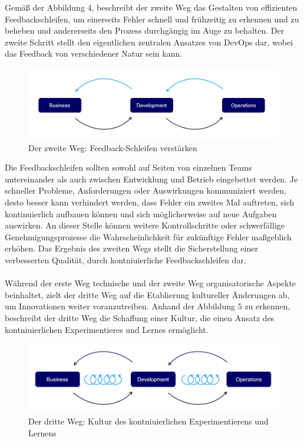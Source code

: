 Gemäß der Abbildung 4, beschreibt der zweite Weg das Gestalten von effizienten Feedbackschleifen, um einerseits Fehler schnell und frühzeitig zu erkennen und zu beheben und andererseits den Prozess durchgängig im Auge zu behalten. Der zweite Schritt stellt den eigentlichen zentralen Ansatzes von DevOps dar, wobei das Feedback von verschiedener Natur sein kann. \cite[S. 254]{tiemeyer_handbuch_2021} 

\begin{figure}[h]
    \centering
    \includegraphics[scale=0.5]{Bilder/Second Way.png}
    \caption{Der zweite Weg: Feedback-Schleifen verstärken \cite{kim_three_2012}}
\end{figure}

Die Feedbackschleifen sollten sowohl auf Seiten von einzelnen Teams untereinander als auch zwischen Entwicklung und Betrieb eingebettet werden. \cite[S. 94]{ravichandran_devops_2016} Je schneller Probleme, Anforderungen oder Auswirkungen kommuniziert werden, desto besser kann verhindert werden, dass Fehler ein zweites Mal auftreten, sich kontinuierlich aufbauen können und sich möglicherweise auf neue Aufgaben auswirken. An dieser Stelle können weitere Kontrollschritte oder schwerfällige Genehmigungsprozesse die Wahrscheinlichkeit für zukünftige Fehler maßgeblich erhöhen. \cite[S. 31]{kim_devops-handbuch_2017} Das Ergebnis des zweiten Wegs stellt die Sicherstellung einer verbesserten Qualität, durch kontniuierliche Feedbackschleifen dar.\\\\ Während der erste Weg technische und der zweite Weg organisatorische Aspekte beinhaltet, zielt der dritte Weg auf die Etablierung kultureller Änderungen ab, um Innovationen weiter voranzutreiben. Anhand der Abbildung 5 zu erkennen, beschreibt der dritte Weg die Schaffung einer Kultur, die einen Ansatz des kontniuierlichen Experimentieres und Lernes ermöglicht. 

\begin{figure}[h]
    \centering
    \includegraphics[scale=0.5]{Bilder/Third Way.png}
    \caption{Der dritte Weg: Kultur des kontniuierlichen Experimentierens und Lernens \cite{kim_three_2012}}
\end{figure}

